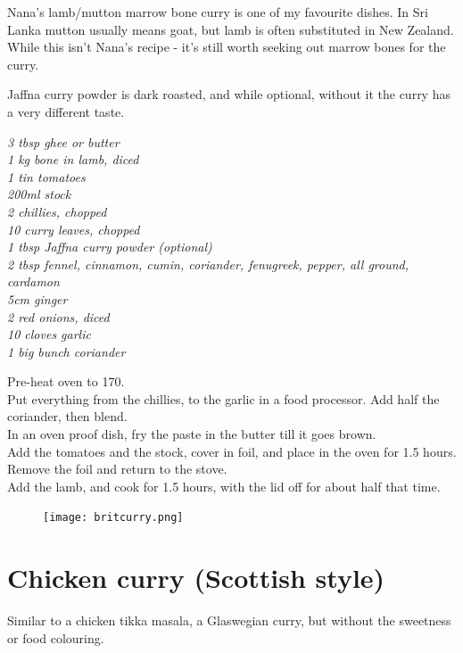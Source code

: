 \documentclass{tufte-book}
\begin{document}
Nana's lamb/mutton marrow bone curry is one of my favourite dishes. In Sri Lanka mutton usually means goat, but lamb is often substituted in New Zealand. While this isn't Nana's recipe - it's still worth seeking out marrow bones for the curry.

Jaffna curry powder is dark roasted, and while optional, without it the curry has a very different taste.

\smallskip
\emph{3 tbsp ghee or butter
\\1 kg bone in lamb, diced
\\1 tin tomatoes
\\200ml stock
\\2 chillies, chopped
\\10 curry leaves, chopped
\\1 tbsp Jaffna curry powder (optional)
\\2 tbsp fennel, cinnamon, cumin, coriander, fenugreek, pepper, all ground, cardamon
\\5cm ginger
\\2 red onions, diced
\\10 cloves garlic
\\1 big bunch coriander}

\smallskip
Pre-heat oven to 170\celsius.
\\Put everything from the chillies, to the garlic in a food processor. Add half the coriander, then blend.
\\In an oven proof dish, fry the paste in the butter till it goes brown.
\\Add the tomatoes and the stock, cover in foil, and place in the oven for 1.5 hours.
\\Remove the foil and return to the stove.
\\Add the lamb, and cook for 1.5 hours, with the lid off for about half that time.


\begin{figure}[h]
  \texttt{[image: britcurry.png]}%
\end{figure}

\section{Chicken curry (Scottish style)}

Similar to a chicken tikka masala, a Glaswegian curry, but without the sweetness or food colouring.
\end{document}
